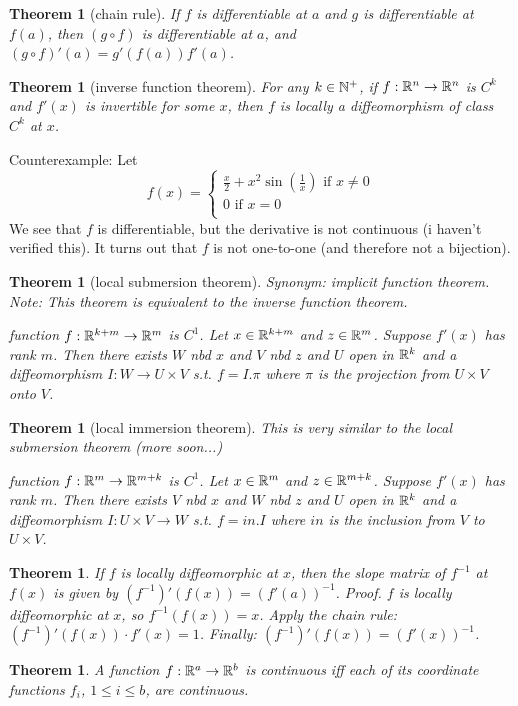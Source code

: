 \documentclass[11pt,leqno,oneside]{amsart}
\theoremstyle{mystyle} \newtheorem{thrm}[thm]{Theorem}
\theoremstyle{mystyle} \newtheorem{defi}[thm]{Definition}
\begin{document}
\begin{thrm}[chain rule]
	If $f$ is differentiable at $a$ and $g$ is differentiable at $f(a)$, then $(g \circ f)$ is differentiable at $a$, and $(g \circ f)'(a) = g'(f(a))f'(a)$.
\end{thrm}
\begin{thrm}[inverse function theorem]
	For any $k \in {\mathbb N}^+$, if $f:{\mathbb R}^n \to {\mathbb R}^n$ is $C^k$ and $f'(x)$ is invertible for some $x$, then $f$ is locally a diffeomorphism of class $C^k$ at $x$.
\end{thrm}
\begin{example}
	Counterexample: Let $$f(x) =
	\begin{cases}
		\frac x2 + x^2\sin\left(\frac 1x\right) \text{ if $x \neq 0$} \\
		0 \text{ if $x=0$} \\
	\end{cases}
	$$  We see that $f$ is differentiable, but the derivative is not continuous (i haven't verified this).  It turns out that $f$ is not one-to-one (and therefore not a bijection).
\end{example}
\begin{thrm}[local submersion theorem]
	Synonym: implicit function theorem.
	Note: This theorem is equivalent to the inverse function theorem.

	function $f : {\mathbb R}^{k+m} \to {\mathbb R}^m$ is $C^1$.
	Let $x \in {\mathbb R}^{k+m}$ and $z \in {\mathbb R}^m$.
	Suppose $f'(x)$ has rank $m$.
	Then there exists $W$ nbd $x$ and $V$ nbd $z$ and $U$ open in ${\mathbb R}^k$ and a diffeomorphism $I : W \to U \times V$
	s.t. $f = I.\pi$ where $\pi$ is the projection from $U \times V$ onto $V$.

\end{thrm}
\begin{thrm}[local immersion theorem]
	This is very similar to the local submersion theorem (more soon...)

	function $f : {\mathbb R}^{m} \to {\mathbb R}^{m+k}$ is $C^1$.
	Let $x \in {\mathbb R}^{m}$ and $z \in {\mathbb R}^{m+k}$.
	Suppose $f'(x)$ has rank $m$.
	Then there exists $V$ nbd $x$ and $W$ nbd $z$ and $U$ open in ${\mathbb R}^k$ and a diffeomorphism $I : U \times V \to W$
	s.t. $f = in.I$ where $in$ is the inclusion from $V$ to $U \times V$.

\end{thrm}
\begin{thrm}
	If $f$ is locally diffeomorphic at $x$, then the slope matrix of $f^{-1}$ at $f(x)$ is given by $(f^{-1})'(f(x)) = (f'(a))^{-1}$.
	Proof. $f$ is locally diffeomorphic at $x$, so $f^{-1}(f(x)) = x$.
	Apply the chain rule: $(f^{-1})'(f(x)) \cdot f'(x) = 1$.
	Finally: $(f^{-1})'(f(x)) = (f'(x))^{-1}$.
\end{thrm}
\begin{thrm}
	A function $f : {\mathbb R}^a \to {\mathbb R}^b$ is continuous iff each of its coordinate functions $f_i$, $1\leq i \leq b$, are continuous.
\end{thrm}
\end{document}
